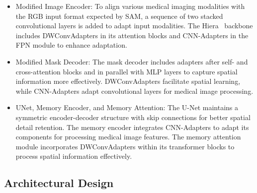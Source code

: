 \begin{itemize}
\item Modified Image Encoder: 
To align various medical imaging modalities with the RGB input format expected by SAM, a sequence of two stacked convolutional layers is added to adapt input modalities. The Hiera~\cite{ryali2023hiera} backbone includes DWConvAdapters in its attention blocks and CNN-Adapters in the FPN module to enhance adaptation.

\item Modified Mask Decoder:
The mask decoder includes adapters after self- and cross-attention blocks and in parallel with MLP layers to capture spatial information more effectively. DWConvAdapters facilitate spatial learning, while CNN-Adapters adapt convolutional layers for medical image processing.

\item UNet, Memory Encoder, and Memory Attention:
The U-Net maintains a symmetric encoder-decoder structure with skip connections for better spatial detail retention. The memory encoder integrates CNN-Adapters to adapt its components for processing medical image features. The memory attention module incorporates DWConvAdapters within its transformer blocks to process spatial information effectively.
\end{itemize}

%



\subsection{Architectural Design}

